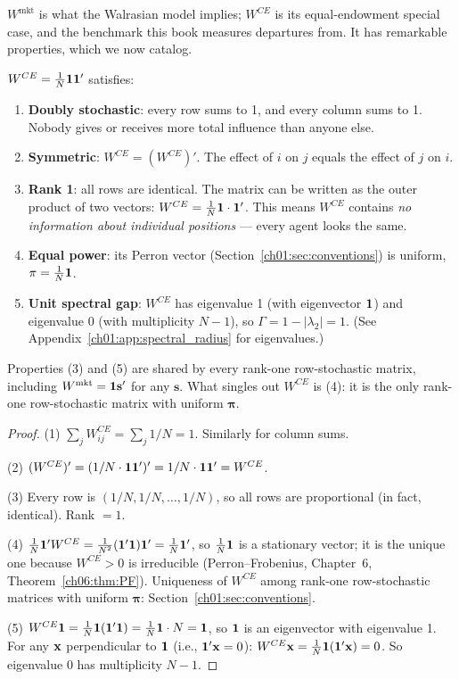 \documentclass[../structural_economics_book.tex]{subfiles}
\begin{document}
$W^{\text{mkt}}$ is what the Walrasian model implies; $W^{CE}$ is its equal-endowment special case, and the benchmark this book measures departures from. It has remarkable properties, which we now catalog.

\begin{proposition}\label{ch01:prop:W_CE}
$W^{CE} = \frac{1}{N}\mathbf{1}\mathbf{1}'$ satisfies:
\begin{enumerate}
\item \textbf{Doubly stochastic}: every row sums to 1, and every column sums to 1. Nobody gives or receives more total influence than anyone else.
\item \textbf{Symmetric}: $W^{CE} = (W^{CE})'$. The effect of $i$ on $j$ equals the effect of $j$ on $i$.
\item \textbf{Rank 1}: all rows are identical. The matrix can be written as the outer product of two vectors: $W^{CE} = \frac{1}{N}\mathbf{1} \cdot \mathbf{1}'$. This means $W^{CE}$ contains \textit{no information about individual positions} --- every agent looks the same.
\item \textbf{Equal power}: its Perron vector (Section~\ref{ch01:sec:conventions}) is uniform, $\pi = \frac{1}{N}\mathbf{1}$.
\item \textbf{Unit spectral gap}: $W^{CE}$ has eigenvalue 1 (with eigenvector $\mathbf{1}$) and eigenvalue 0 (with multiplicity $N-1$), so $\Gamma = 1 - |\lambda_2| = 1$. (See Appendix~\ref{ch01:app:spectral_radius} for eigenvalues.)
\end{enumerate}
Properties (3) and (5) are shared by every rank-one row-stochastic matrix, including $W^{\text{mkt}} = \mathbf{1}\mathbf{s}'$ for any $\mathbf{s}$. What singles out $W^{CE}$ is (4): it is the only rank-one row-stochastic matrix with uniform $\boldsymbol{\pi}$.
\end{proposition}

\begin{proof}
(1) $\sum_j W^{CE}_{ij} = \sum_j 1/N = 1$. Similarly for column sums.

(2) $(W^{CE})' = (1/N \cdot \mathbf{1}\mathbf{1}')' = 1/N \cdot \mathbf{1}\mathbf{1}' = W^{CE}$.

(3) Every row is $(1/N, 1/N, \ldots, 1/N)$, so all rows are proportional (in fact, identical). Rank $= 1$.

(4) $\frac{1}{N}\mathbf{1}'W^{CE} = \frac{1}{N^2}(\mathbf{1}'\mathbf{1})\mathbf{1}' = \frac{1}{N}\mathbf{1}'$, so $\frac{1}{N}\mathbf{1}$ is a stationary vector; it is the unique one because $W^{CE} > 0$ is irreducible (Perron--Frobenius, Chapter~6, Theorem~\ref{ch06:thm:PF}). Uniqueness of $W^{CE}$ among rank-one row-stochastic matrices with uniform $\boldsymbol{\pi}$: Section~\ref{ch01:sec:conventions}.

(5) $W^{CE}\mathbf{1} = \frac{1}{N}\mathbf{1}(\mathbf{1}'\mathbf{1}) = \frac{1}{N}\mathbf{1} \cdot N = \mathbf{1}$, so $\mathbf{1}$ is an eigenvector with eigenvalue 1. For any $\mathbf{x}$ perpendicular to $\mathbf{1}$ (i.e., $\mathbf{1}'\mathbf{x} = 0$): $W^{CE}\mathbf{x} = \frac{1}{N}\mathbf{1}(\mathbf{1}'\mathbf{x}) = 0$. So eigenvalue 0 has multiplicity $N-1$.
\end{proof}
\end{document}
